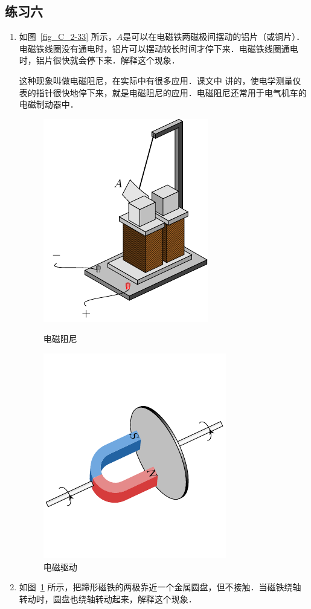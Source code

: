 \subsection*{练习六}
\begin{enumerate}
    \item 如图~\ref{fig_C_2-33} 所示，$A$是可以在电磁铁两磁极间摆动的铝片（或铜片）．电磁铁线圈没有通电时，铝片可以摆动较长时间才停下来．电磁铁线圈通电时，铝片很快就会停下来．解释这个现象．
    
这种现象叫做电磁阻尼，在实际中有很多应用．课文中
讲的，使电学测量仪表的指针很快地停下来，就是电磁阻尼的应用．电磁阻尼还常用于电气机车的电磁制动器中．
\begin{figure}[htbp]
    \centering
    \begin{minipage}[t]{0.48\textwidth}
        \centering
        \includegraphics{fig/C/2-33.pdf}
        \caption{电磁阻尼}\label{fig_C_2-33}
    \end{minipage}
    \begin{minipage}[t]{0.48\textwidth}
        \centering
        \includegraphics{fig/C/2-34.pdf}
        \caption{电磁驱动}\label{fig_C_2-34}
    \end{minipage}
\end{figure}
\item 如图~\ref{fig_C_2-34} 所示，把蹄形磁铁的两极靠近一个金属圆盘，但不接触．当磁铁绕轴转动时，圆盘也绕轴转动起来，解释这个现象．


\end{enumerate}
